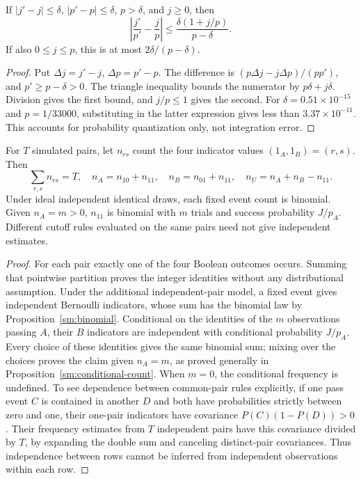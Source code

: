 \begin{proposition}
\label{tw:quantization}
If \(|j'-j|\leq\delta\), \(|p'-p|\leq\delta\), \(p>\delta\),
and \(j\geq0\), then
\[
 \left|\frac{j'}{p'}-\frac jp\right|
 \leq\frac{\delta(1+j/p)}{p-\delta}.
\]
If also \(0\leq j\leq p\), this is at most
\(2\delta/(p-\delta)\).
\end{proposition}
\begin{proof}
Put \(\Delta j=j'-j\), \(\Delta p=p'-p\). The difference is
\((p\Delta j-j\Delta p)/(pp')\), and \(p'\geq p-\delta>0\).
The triangle inequality bounds the numerator by \(p\delta+j\delta\).
Division gives the first bound, and \(j/p\leq1\) gives the second.
For \(\delta=0.51\times10^{-15}\) and \(p=1/33000\), substituting
in the latter expression gives less than \(3.37\times10^{-11}\).
This accounts for probability quantization only, not integration error.
\end{proof}

\begin{proposition}
\label{tw:simulation}
For \(T\) simulated pairs, let \(n_{rs}\) count the four indicator
values \((1_A,1_B)=(r,s)\). Then
\[
 \sum_{r,s}n_{rs}=T,\quad n_A=n_{10}+n_{11},\quad
 n_B=n_{01}+n_{11},\quad n_U=n_A+n_B-n_{11}.
\]
Under ideal independent identical draws, each fixed event count is binomial.
Given \(n_A=m>0\), \(n_{11}\) is binomial with \(m\) trials and
success probability \(J/p_A\). Different cutoff rules evaluated on the
same pairs need not give independent estimates.
\end{proposition}
\begin{proof}
For each pair exactly one of the four Boolean outcomes occurs. Summing that
pointwise partition proves the integer identities without any distributional
assumption. Under the additional independent-pair model, a fixed event gives
independent Bernoulli indicators, whose sum has the binomial law by
Proposition~\ref{sm:binomial}. Conditional on the identities of the \(m\)
observations passing \(A\), their \(B\) indicators are independent with
conditional probability \(J/p_A\). Every choice of these identities gives
the same binomial sum; mixing over the choices proves the claim given
\(n_A=m\), as proved generally in Proposition~\ref{sm:conditional-count}.
When \(m=0\), the conditional frequency is undefined. To see dependence
between common-pair rules explicitly, if one pass event \(C\) is contained
in another \(D\) and both have probabilities strictly between zero and
one, their one-pair indicators have covariance
\(P(C)(1-P(D))>0\). Their frequency estimates from \(T\) independent
pairs have this covariance divided by \(T\), by expanding the double
sum and canceling distinct-pair covariances. Thus independence between rows
cannot be inferred from independent observations within each row.
\end{proof}
